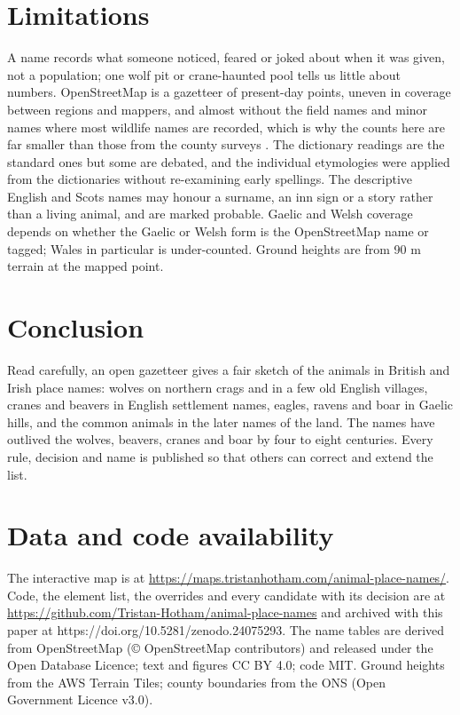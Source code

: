 \documentclass[11pt,a4paper]{article}
\begin{document}
\section{Limitations}
A name records what someone noticed, feared or joked about when it was given, not a population; one wolf pit or crane-haunted pool tells us little about numbers. OpenStreetMap is a gazetteer of present-day points, uneven in coverage between regions and mappers, and almost without the field names and minor names where most wildlife names are recorded, which is why the counts here are far smaller than those from the county surveys \citep{aybes1995}. The dictionary readings are the standard ones but some are debated, and the individual etymologies were applied from the dictionaries without re-examining early spellings. The descriptive English and Scots names may honour a surname, an inn sign or a story rather than a living animal, and are marked probable. Gaelic and Welsh coverage depends on whether the Gaelic or Welsh form is the OpenStreetMap name or tagged; Wales in particular is under-counted. Ground heights are from 90 m terrain at the mapped point.

\section{Conclusion}
Read carefully, an open gazetteer gives a fair sketch of the animals in British and Irish place names: wolves on northern crags and in a few old English villages, cranes and beavers in English settlement names, eagles, ravens and boar in Gaelic hills, and the common animals in the later names of the land. The names have outlived the wolves, beavers, cranes and boar by four to eight centuries. Every rule, decision and name is published so that others can correct and extend the list.

\section*{Data and code availability}
The interactive map is at \url{https://maps.tristanhotham.com/animal-place-names/}. Code, the element list, the overrides and every candidate with its decision are at \url{https://github.com/Tristan-Hotham/animal-place-names} and archived with this paper at https://doi.org/10.5281/zenodo.24075293. The name tables are derived from OpenStreetMap (\copyright{} OpenStreetMap contributors) and released under the Open Database Licence; text and figures CC BY 4.0; code MIT. Ground heights from the AWS Terrain Tiles; county boundaries from the ONS (Open Government Licence v3.0).
\end{document}
